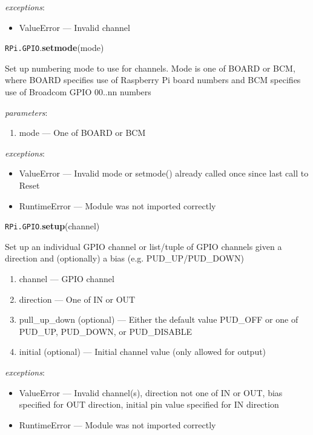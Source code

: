 \documentclass[12pt]{article}
\begin{document}
\textit{exceptions}:
\begin{itemize}
    \item ValueError --- Invalid channel
\end{itemize}


\noindent \texttt{RPi.GPIO}.\textbf{setmode}(mode)

Set up numbering mode to use for channels. Mode is one of BOARD or BCM, where BOARD specifies use of Raspberry Pi board numbers and BCM specifies use of Broadcom GPIO 00..nn numbers
        
\textit{parameters}:
\begin{enumerate}      
        \item mode --- One of BOARD or BCM
\end{enumerate}
 
 
\textit{exceptions}:
\begin{itemize}
    \item ValueError --- Invalid mode or setmode() already called once since last call to Reset
    \item RuntimeError --- Module was not imported correctly 
\end{itemize}

\noindent \texttt{RPi.GPIO}.\textbf{setup}(channel)
 
 
Set up an individual GPIO channel or list/tuple of GPIO channels given a direction and (optionally) a bias (e.g. PUD\_UP/PUD\_DOWN)

\begin{enumerate}      
        \item channel --- GPIO channel
        \item direction --- One of IN or OUT
        \item pull\_up\_down (optional) --- Either the default value PUD\_OFF or one of PUD\_UP, PUD\_DOWN, or PUD\_DISABLE
        \item initial (optional) --- Initial channel value (only allowed for output)
\end{enumerate}
 
 
\textit{exceptions}:
\begin{itemize}
    \item ValueError --- Invalid channel(s), direction not one of IN or OUT, bias specified for OUT direction, initial pin value specified for IN direction
    \item RuntimeError --- Module was not imported correctly 
\end{itemize}
\end{document}
